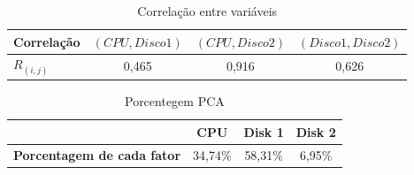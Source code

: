 \documentclass[11pt,a4paper,openany,oneside]{abntex2}
\begin{document}
\begin{table}[H]
	\centering
	\caption{Correlação entre variáveis} 
	\begin{tabular}{lccc}
		\toprule
		    Correlação & $(CPU,Disco 1)$ & $(CPU,Disco 2)$ & $(Disco 1,Disco 2)$\\
		\midrule
		$R_{(i,j)}$    & 0,465  & 0,916	& 0,626\\
		\bottomrule
	\end{tabular}%
	\label{tab:correlacao}%
\end{table}%

		





\begin{table}[h]
	\caption{Porcentegem PCA}
		\centering
	\begin{tabular}{|c|c|c|c|}
		\hline
		& \textbf{CPU} & \textbf{Disk 1} & \textbf{Disk 2} \\ \hline
		\hline
		\textbf{Porcentagem de cada fator} & 34,74\% & 58,31\% & 6,95\% \\ \hline
	\end{tabular}
	\label{tab:porcentagenpca}
\end{table}
\end{document}
